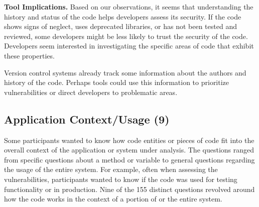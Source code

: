 \documentclass[conference]{IEEEtran}
\begin{document}

% 

\noindent\textbf{Tool Implications.}
Based on our observations, it seems that understanding the history and status of the code helps developers assess its security.
If the code shows signs of neglect, uses deprecated libraries, or has not been tested and reviewed, some developers might be less likely to trust the security of the code.
Developers seem interested in investigating the specific areas of code that exhibit these properties. 

Version control systems already track some information about the authors and history of the code.
Perhaps tools could use this information to prioritize vulnerabilities or direct developers to problematic areas.



\noindent\subsection{\textbf{Application Context/Usage (9)}}\label{acu}


Some participants wanted to know how code entities or pieces of code fit into the overall context of the application or system under analysis. 
The questions ranged from specific questions about a method or variable to general questions regarding the usage of the entire system. 
For example, often when assessing the vulnerabilities, participants wanted to know if the code was used for testing functionality or in production. 
Nine of the 155 distinct questions revolved around how the code works in the context of a portion of or the entire system.
\\
\end{document}
